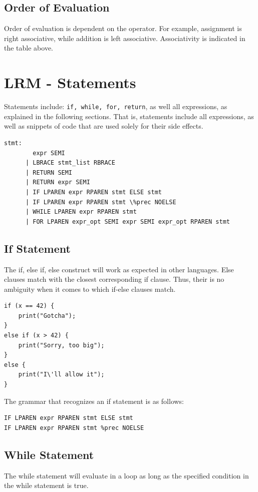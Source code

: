 \documentclass{article}
\begin{document}
\subsection{Order of Evaluation}
Order of evaluation is dependent on the operator. For example, assignment is right associative, while addition is left associative. Associativity is indicated in the table above.

\section{LRM - Statements}
Statements include: \texttt{if, while, for, return}, as well all expressions, as explained in the following sections. That is, statements include all expressions, as well as snippets of code that are used solely for their side effects.

\begin{Verbatim}[frame=single]
stmt:
	    expr SEMI 					
	  | LBRACE stmt_list RBRACE				
	  | RETURN SEMI					
	  | RETURN expr SEMI				 
	  | IF LPAREN expr RPAREN stmt ELSE stmt 	     
	  | IF LPAREN expr RPAREN stmt \%prec NOELSE 	     
	  | WHILE LPAREN expr RPAREN stmt 		   
  	  | FOR LPAREN expr_opt SEMI expr SEMI expr_opt RPAREN stmt 

\end{Verbatim}

\subsection{If Statement}
The if, else if, else construct will work as expected in other languages. Else clauses match with the closest corresponding if clause. Thus, their is no ambiguity when it comes to which if-else clauses match.

\begin{lstlisting}
if (x == 42) {
	print("Gotcha");
}
else if (x > 42) {
	print("Sorry, too big");
}
else {
	print("I\'ll allow it");
}
\end{lstlisting}

The grammar that recognizes an if statement is as follows:
\begin{Verbatim}[frame=single]
IF LPAREN expr RPAREN stmt ELSE stmt
IF LPAREN expr RPAREN stmt %prec NOELSE
\end{Verbatim}

\subsection{While Statement}
The while statement will evaluate in a loop as long as the specified condition in the while statement is true.
\end{document}
